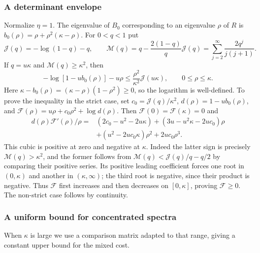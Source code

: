 \documentclass[11pt,a4paper]{article}
\numberwithin{equation}{section}
\begin{document}
\subsubsection{A determinant envelope}
Normalize $\eta=1$. The eigenvalue of $B_0$ corresponding to an
eigenvalue $\rho$ of $R$ is $b_0(\rho)=\rho+\rho^2(\kappa-\rho)$.
For $0<q<1$ put
\[
 \mathcal J(q)=-\log(1-q)-q,\qquad
 \mathcal M(q)=q-\frac{2(1-q)}q\mathcal J(q)
     =\sum_{j=2}^\infty\frac{2q^j}{j(j+1)}.
\]
If $q=u\kappa$ and $\mathcal M(q)\ge\kappa^2$, then
\begin{equation}\label{eq:app-low-shape-envelope}
 -\log[1-u b_0(\rho)]-u\rho
 \le\frac{\rho^2}{\kappa^2}\mathcal J(u\kappa),\qquad0\le \rho\le\kappa.
\end{equation}
Here $\kappa-b_0(\rho)=(\kappa-\rho)(1-\rho^2)\ge0$, so the logarithm is well-defined.
To prove the inequality in the strict case, set
$c_0=\mathcal J(q)/\kappa^2$, $d(\rho)=1-u b_0(\rho)$, and
$\mathcal F(\rho)=u\rho+c_0\rho^2+\log d(\rho)$.
Then $\mathcal F(0)=\mathcal F(\kappa)=0$ and
\[
 \begin{split}
 d(\rho)\mathcal F'(\rho)/\rho={}&(2c_0-u^2-2u\kappa)
 +(3u-u^2\kappa-2uc_0)\rho\\
 &+(u^2-2uc_0\kappa)\rho^2+2uc_0\rho^3.
 \end{split}
\]
This cubic is positive at zero and negative at $\kappa$.
Indeed the latter sign is precisely $\mathcal M(q)>\kappa^2$, and the former
follows from
$\mathcal M(q)<\mathcal J(q)/q-q/2$ by comparing their positive series.
Its positive leading coefficient forces one root in $(0,\kappa)$ and
another in $(\kappa,\infty)$; the third root is negative, since their
product is negative. Thus $\mathcal F$ first increases and then decreases on
$[0,\kappa]$, proving $\mathcal F\ge0$. The non-strict case follows by continuity.

\subsubsection{A uniform bound for concentrated spectra}
When $\kappa$ is large we use a comparison matrix adapted to that range,
giving a constant upper bound for the mixed cost.
\end{document}
